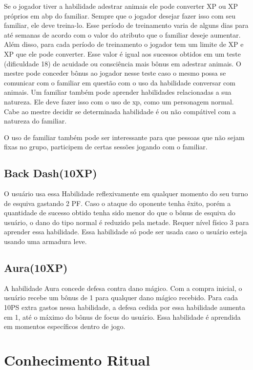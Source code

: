 Se o jogador tiver a habilidade adestrar animais ele pode converter XP ou XP próprios em abp do familiar. Sempre que o jogador desejar fazer isso com seu familiar, ele deve treina-lo. Esse período de treinamento varia de alguns dias para até semanas de acordo com o valor do atributo que o familiar deseje aumentar. Além disso, para cada período de treinamento o jogador tem um limite de XP e XP que ele pode converter. Esse valor é igual aos sucessos obtidos em um teste (dificuldade 18) de acuidade ou consciência mais bônus em adestrar animais. O mestre pode conceder bônus ao jogador nesse teste caso o mesmo possa se comunicar com o familiar em questão com o uso da habilidade conversar com animais. Um familiar também pode aprender habilidades relacionadas a sua natureza. Ele deve fazer isso com o uso de xp, como um personagem normal. Cabe ao mestre decidir se determinada habilidade é ou não compátivel com a natureza do familiar.

O uso de familiar também pode ser interessante para que pessoas que não sejam fixas no grupo, participem de certas sessões jogando com o familiar.



\subsection {Back Dash(10XP)}
O usuário usa essa Habilidade reflexivamente em qualquer momento do seu turno de esquiva gastando 2 PF. Caso o ataque do oponente tenha êxito, porém a quantidade de sucesso obtido tenha sido menor do que o bônus de esquiva do usuário, o dano do tipo normal é reduzido pela metade. Requer nível físico 3 para aprender essa habilidade. Essa habilidade só pode ser usada caso o usuário esteja usando uma armadura leve.

\subsection {Aura(10XP)}
A habilidade Aura concede defesa contra dano mágico. Com a compra inicial, o usuário recebe um bônus de 1 para qualquer dano mágico recebido. Para cada 10PS extra gastos nessa habilidade, a defesa cedida por essa habilidade aumenta em 1, até o máximo do bônus de focus do usuário. Essa habilidade é aprendida em momentos específicos dentro de jogo.


 
 \section{Conhecimento Ritual}
 
